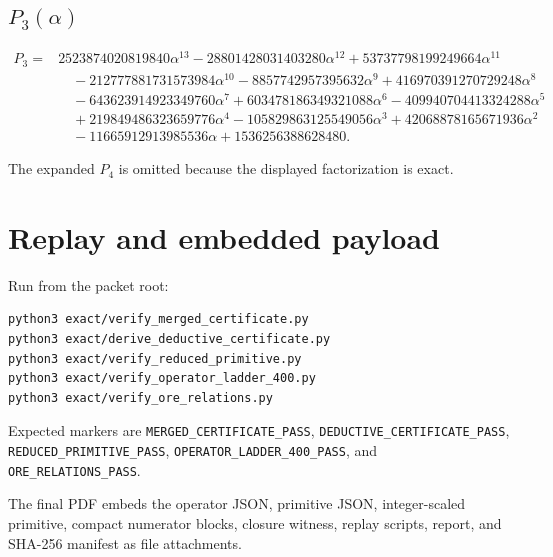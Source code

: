 \documentclass[9pt]{extarticle}
\begin{document}
{\subsection*{$P_3(\alpha)$}
\begin{align*}
P_3={}& 2523874020819840\alpha^{13} - 28801428031403280\alpha^{12} + 53737798199249664\alpha^{11} \\
&\quad - 212777881731573984\alpha^{10} - 8857742957395632\alpha^{9} + 416970391270729248\alpha^{8} \\
&\quad - 643623914923349760\alpha^{7} + 603478186349321088\alpha^{6} - 409940704413324288\alpha^{5} \\
&\quad + 219849486323659776\alpha^{4} - 105829863125549056\alpha^{3} + 42068878165671936\alpha^{2} \\
&\quad - 11665912913985536\alpha + 1536256388628480.
\end{align*}

}
\medskip
\noindent The expanded $P_4$ is omitted because the displayed factorization is exact.

\section*{Replay and embedded payload}
Run from the packet root:
\begin{verbatim}
python3 exact/verify_merged_certificate.py
python3 exact/derive_deductive_certificate.py
python3 exact/verify_reduced_primitive.py
python3 exact/verify_operator_ladder_400.py
python3 exact/verify_ore_relations.py
\end{verbatim}
Expected markers are
\texttt{MERGED\_CERTIFICATE\_PASS},
\texttt{DEDUCTIVE\_CERTIFICATE\_PASS},
\texttt{REDUCED\_PRIMITIVE\_PASS},
\texttt{OPERATOR\_LADDER\_400\_PASS}, and
\texttt{ORE\_RELATIONS\_PASS}.

The final PDF embeds the operator JSON, primitive JSON, integer-scaled
primitive, compact numerator blocks, closure witness, replay scripts, report,
and SHA-256 manifest as file attachments.
\end{document}
